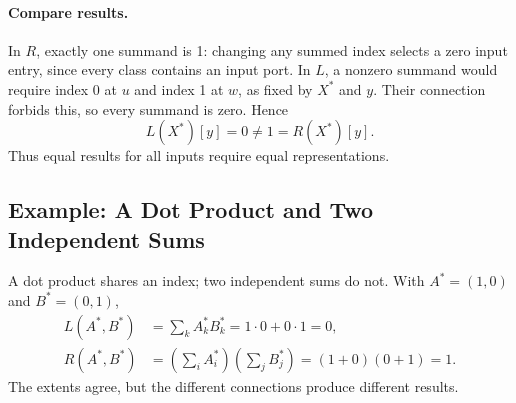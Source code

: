\paragraph{Compare results.}
In $R$, exactly one summand is 1: changing any summed index selects a zero
input entry, since every class contains an input port. In $L$, a nonzero
summand would require index 0 at $u$ and index 1 at $w$, as fixed by $X^*$
and $y$. Their connection forbids this, so every summand is zero. Hence
\begin{equation}
 L(X^*)[y]=0\ne1=R(X^*)[y].
\end{equation}
Thus equal results for all inputs require equal representations.

\subsection{Example: A Dot Product and Two Independent Sums}
A dot product shares an index; two independent sums do not. With
$A^*=(1,0)$ and $B^*=(0,1)$,
\begin{equation}
\begin{aligned}
 L(A^*,B^*)&=\sum_k A^*_k B^*_k=1\cdot0+0\cdot1=0,\\
 R(A^*,B^*)&=\left(\sum_i A^*_i\right)
             \left(\sum_j B^*_j\right)=(1+0)(0+1)=1.
\end{aligned}
\end{equation}
The extents agree, but the different connections produce different results.
